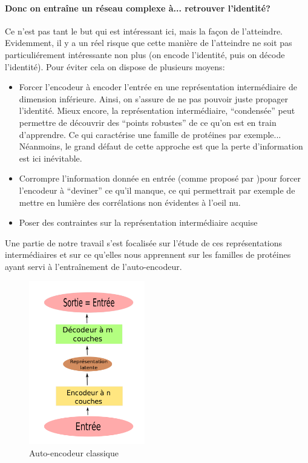 \documentclass[a4paper, journal, 11pt, onecolumn]{IEEEtran}
\begin{document}
\paragraph{Donc on entraîne un réseau complexe à... retrouver l'identité?}

Ce n'est pas tant le but qui est intéressant ici, mais la façon de l'atteindre.
Evidemment, il y a un réel risque que cette manière de l'atteindre ne soit pas
particuliérement intéressante non plus (on encode l'identité, puis on décode
l'identité). Pour éviter cela on dispose de plusieurs moyens:

\begin{itemize}
\item Forcer l'encodeur à encoder l'entrée en une représentation intermédiaire
  de dimension inférieure. Ainsi, on s'assure de ne pas pouvoir juste propager
  l'identité. Mieux encore, la représentation intermédiaire, ``condensée'' peut
  permettre de découvrir des ``points robustes'' de ce qu'on est en train
  d'apprendre. Ce qui caractérise une famille de protéines par exemple...
  Néanmoins, le grand défaut de cette approche est que la perte d'information
  est ici inévitable.
\item Corrompre l'information donnée en entrée (comme proposé par \cite{Vincent:2008:ECR:1390156.1390294})pour forcer l'encodeur à
  ``deviner'' ce qu'il manque, ce qui permettrait par exemple de mettre en
  lumière des corrélations non évidentes à l'oeil nu.
\item Poser des contraintes sur la représentation intermédiaire acquise

\end{itemize}

Une partie de notre travail s'est focalisée sur l'étude de ces représentations
intermédiaires et sur ce qu'elles nous apprennent sur les familles de protéines
ayant servi à l'entraînement de l'auto-encodeur.

\begin{figure}
  \includegraphics[width=0.45\textwidth]{Autoencoder}
  \caption{Auto-encodeur classique}
\end{figure}
\end{document}
